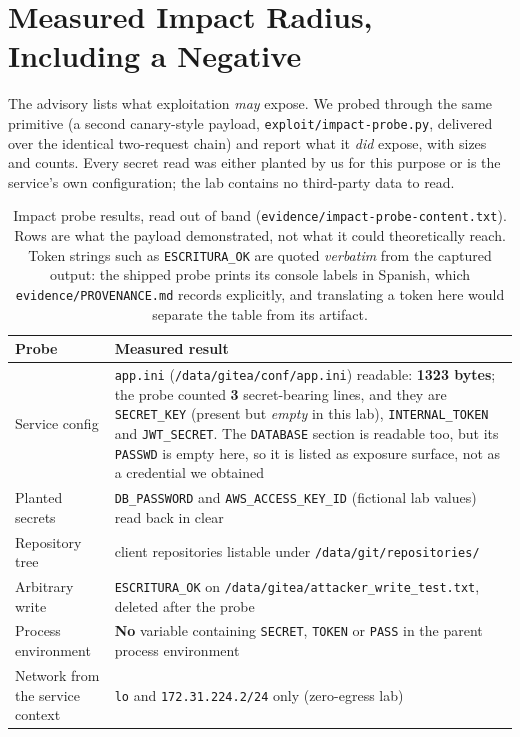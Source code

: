 \section{Measured Impact Radius, Including a Negative}
\label{sec:impact}

The advisory lists what exploitation \emph{may} expose. We probed through the
same primitive (a second canary-style payload, \texttt{exploit/impact-probe.py},
delivered over the identical two-request chain) and report what it \emph{did}
expose, with sizes and counts. Every secret read was either planted by us for
this purpose or is the service's own configuration; the lab contains no
third-party data to read.

\begin{table}[t]
\centering
\footnotesize
\begin{tabular}{@{}p{2.2cm}p{5.4cm}@{}}
\toprule
Probe & Measured result \\
\midrule
Service config & \texttt{app.ini}
(\texttt{\allowbreak /data/\allowbreak gitea/\allowbreak conf/app.ini}) readable: \textbf{1323 bytes}; the
probe counted \textbf{3} secret-bearing lines, and they are \texttt{SECRET\_KEY}
(present but \emph{empty} in this lab), \texttt{INTERNAL\_TOKEN} and
\texttt{JWT\_SECRET}. The \texttt{DATABASE} section is readable too, but its
\texttt{PASSWD} is empty here, so it is listed as exposure surface, not as a
credential we obtained \\
Planted secrets & \texttt{DB\_PASSWORD} and \texttt{AWS\_ACCESS\_KEY\_ID}
(fictional lab values) read back in clear \\
Repository tree & client repositories listable under
\texttt{/data/git/repositories/} \\
Arbitrary write & \texttt{ESCRITURA\_OK} on
\texttt{\allowbreak /data/\allowbreak gitea/\allowbreak attacker\_write\_\allowbreak test.txt}, deleted after the probe \\
Process environment & \textbf{No} variable containing
\texttt{SECRET}, \texttt{TOKEN} or \texttt{PASS} in the parent process
environment \\
Network from the service context & \texttt{lo} and \texttt{172.31.224.2/24}
only (zero-egress lab) \\
\bottomrule
\end{tabular}
\caption{Impact probe results, read out of band
(\texttt{evidence/impact-probe-content.txt}). Rows are what the payload
demonstrated, not what it could theoretically reach. Token strings such as
\texttt{ESCRITURA\_OK} are quoted \emph{verbatim} from the captured output: the shipped
probe prints its console labels in Spanish, which \texttt{evidence/PROVENANCE.md} records
explicitly, and translating a token here would separate the table from its artifact.}
\label{tab:impact}
\end{table}

